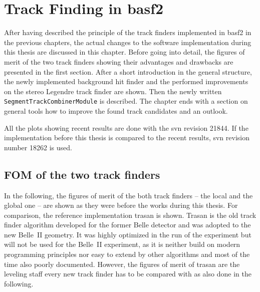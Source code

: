 \chapter{Track Finding in basf2} \label{chapter-workflow}

After having described the principle of the track finders implemented in basf2 in the previous chapters, the actual changes to the software implementation during this thesis are discussed in this chapter. Before going into detail, the figures of merit of the two track finders showing their advantages and drawbacks are presented in the first section. After a short introduction in the general structure, the newly implemented background hit finder and the performed improvements on the stereo Legendre track finder are shown. Then the newly written \texttt{SegmentTrackCombinerModule} is described. The chapter ends with a section on general tools how to improve the found track candidates and an outlook.

All the plots showing recent results are done with the svn revision 21844. If the implementation before this thesis is compared to the recent results, svn revision number 18262 is used.

\section{FOM of the two track finders} \label{section-fom}

In the following, the figures of merit of the both track finders -- the local and the global one -- are shown as they were before the works during this thesis. For comparison, the reference implementation trasan is shown. Trasan is the old track finder algorithm developed for the former Belle detector and was adopted to the new Belle~II geometry. It was highly optimized in the run of the experiment but will not be used for the Belle~II experiment, as it is neither build on modern programming principles nor easy to extend by other algorithms and most of the time also poorly documented. However, the figures of merit of trasan are the leveling staff every new track finder has to be compared with as also done in the following.


